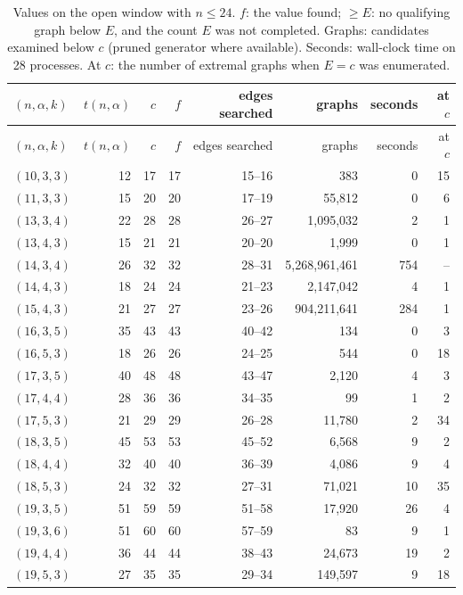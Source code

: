{\small
\begin{longtable}{lrrrrrrr}
\caption{Values on the open window with $n\le24$. $f$: the value found; $\ge E$: no qualifying graph below $E$, and the count $E$ was not completed. Graphs: candidates examined below $c$ (pruned generator where available). Seconds: wall-clock time on 28 processes. At $c$: the number of extremal graphs when $E=c$ was enumerated.}\label{tab:values}\\
\toprule
$(n,\alpha,k)$ & $t(n,\alpha)$ & $c$ & $f$ & edges searched & graphs & seconds & at $c$ \\
\midrule
\endfirsthead
\toprule
$(n,\alpha,k)$ & $t(n,\alpha)$ & $c$ & $f$ & edges searched & graphs & seconds & at $c$ \\
\midrule
\endhead
$(10,3,3)$ & 12 & 17 & 17 & 15--16 & 383 & 0 & 15 \\
$(11,3,3)$ & 15 & 20 & 20 & 17--19 & 55{,}812 & 0 & 6 \\
$(13,3,4)$ & 22 & 28 & 28 & 26--27 & 1{,}095{,}032 & 2 & 1 \\
$(13,4,3)$ & 15 & 21 & 21 & 20--20 & 1{,}999 & 0 & 1 \\
$(14,3,4)$ & 26 & 32 & 32 & 28--31 & 5{,}268{,}961{,}461 & 754 & -- \\
$(14,4,3)$ & 18 & 24 & 24 & 21--23 & 2{,}147{,}042 & 4 & 1 \\
$(15,4,3)$ & 21 & 27 & 27 & 23--26 & 904{,}211{,}641 & 284 & 1 \\
$(16,3,5)$ & 35 & 43 & 43 & 40--42 & 134 & 0 & 3 \\
$(16,5,3)$ & 18 & 26 & 26 & 24--25 & 544 & 0 & 18 \\
$(17,3,5)$ & 40 & 48 & 48 & 43--47 & 2{,}120 & 4 & 3 \\
$(17,4,4)$ & 28 & 36 & 36 & 34--35 & 99 & 1 & 2 \\
$(17,5,3)$ & 21 & 29 & 29 & 26--28 & 11{,}780 & 2 & 34 \\
$(18,3,5)$ & 45 & 53 & 53 & 45--52 & 6{,}568 & 9 & 2 \\
$(18,4,4)$ & 32 & 40 & 40 & 36--39 & 4{,}086 & 9 & 4 \\
$(18,5,3)$ & 24 & 32 & 32 & 27--31 & 71{,}021 & 10 & 35 \\
$(19,3,5)$ & 51 & 59 & 59 & 51--58 & 17{,}920 & 26 & 4 \\
$(19,3,6)$ & 51 & 60 & 60 & 57--59 & 83 & 9 & 1 \\
$(19,4,4)$ & 36 & 44 & 44 & 38--43 & 24{,}673 & 19 & 2 \\
$(19,5,3)$ & 27 & 35 & 35 & 29--34 & 149{,}597 & 9 & 18 \\

\end{longtable}}
